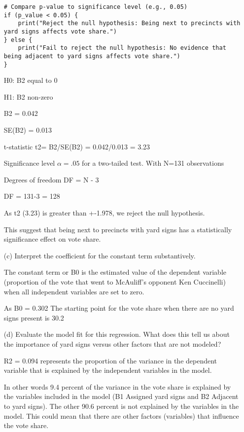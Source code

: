 \documentclass[12pt,letterpaper]{article}
\begin{document}
\begin{enumerate}
\begin{lstlisting}
# Compare p-value to significance level (e.g., 0.05)
if (p_value < 0.05) {
	print("Reject the null hypothesis: Being next to precincts with yard signs affects vote share.")
} else {
	print("Fail to reject the null hypothesis: No evidence that being adjacent to yard signs affects vote share.")
}
\end{lstlisting}
	H0: B2 equal to 0
	
	H1: B2 non-zero
	
	B2 = 0.042
	
	SE(B2) = 0.013
	
	t-statistic
	t2= B2/SE(B2) = 0.042/0.013 = 3.23
	
	Significance level  $\alpha = .05$ for a two-tailed test. With N=131 observations
	
	Degrees of freedom DF = N - 3
	
	DF = 131-3 = 128
	
	As t2 (3.23) is greater than +-1.978, we reject the null hypothesis. 
	
	This suggest that being next to precincts with yard signs has a statistically significance effect on vote share.
	
	\newpage	
	\vspace{1cm}
	\item [(c)] Interpret the coefficient for the constant term substantively.
	
	The constant term or B0 is the estimated value of the dependent variable 
	(proportion of the vote that went to McAuliff's opponent Ken Cuccinelli) when all 
	independent variables are set to zero.
	
	As B0 = 0.302 The starting point for the vote share when there are no yard signs present is 30.2%
	
	\vspace{1cm}
	
	\item [(d)] Evaluate the model fit for this regression.  What does this	tell us about the importance of yard signs versus other factors that are not modeled?
	
	R2 = 0.094 represents the proportion of the variance in the dependent variable that is explained by
	the independent variables in the model. 
	
	In other words 9.4 percent of the variance in the vote share is explained by the variables included
	in the model (B1 Assigned yard signs and B2 Adjacent to yard signs). The other 90.6 percent is not 
	explained by the variables in the model. This could mean that there are other factors (variables) that
	influence the vote share. 
	
\end{enumerate}  
\end{document}
